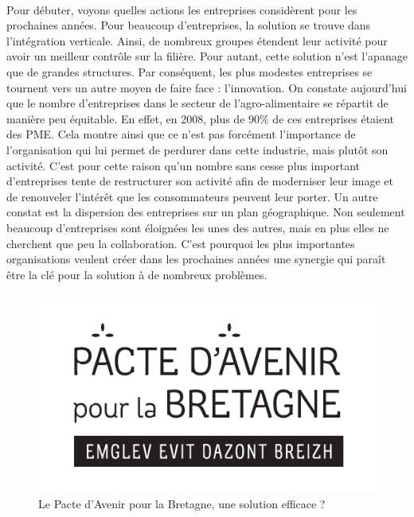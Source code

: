 \documentclass[a4paper,12pt]{report}
\begin{document}
			\paragraph{}Pour débuter, voyons quelles actions les entreprises considèrent pour les prochaines années. Pour beaucoup d’entreprises, la solution se trouve dans l’intégration verticale. Ainsi, de nombreux groupes étendent leur activité pour avoir un meilleur contrôle sur la filière. Pour autant, cette solution n’est l’apanage que de grandes structures. Par conséquent, les plus modestes entreprises se tournent vers un autre moyen de faire face : l’innovation. On constate aujourd’hui que le nombre d’entreprises dans le secteur de l’agro-alimentaire se répartit de manière peu équitable. En effet, en 2008, plus de 90\% de ces entreprises étaient des PME\cite{IAAFranceChiffres}. Cela montre ainsi que ce n’est pas forcément l’importance de l’organisation qui lui permet de perdurer dans cette industrie, mais plutôt son activité. C’est pour cette raison qu’un nombre sans cesse plus important d’entreprises tente de restructurer son activité afin de moderniser leur image et de renouveler l’intérêt que les consommateurs peuvent leur porter. Un autre constat est la dispersion des entreprises sur un plan géographique. Non seulement beaucoup d’entreprises sont éloignées les unes des autres, mais en plus elles ne cherchent que peu la collaboration. C’est pourquoi les plus importantes organisations veulent créer dans les prochaines années une synergie qui paraît être la clé pour la solution à de nombreux problèmes.
			
			\begin{figure}[!h]
			\centering
			\includegraphics[scale=1]{Illustrations/Pacte_Avenir_Bretagne.png}
			\caption{Le Pacte d'Avenir pour la Bretagne, une solution efficace ?}
			\label{PacteAvenirPourBretagne}			
			\end{figure}
			
\end{document}
